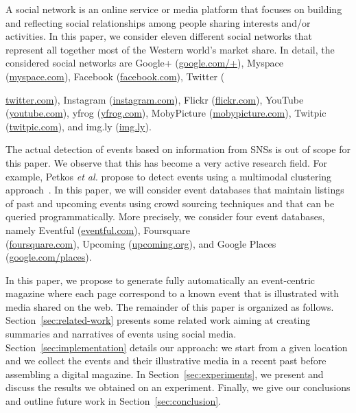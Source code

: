 \documentclass{acm_proc_article-sp}
\let\oldemph\emph
\renewcommand{\emph}[1]{\oldemph{\fontsize{9}{9}\selectfont #1}}
\begin{document}
A social network is an online service or media platform that focuses on building and reflecting social relationships among people sharing interests and/or activities. In this paper, we consider eleven different social networks that represent all together most of the Western world's market share. In detail, the considered social networks are
\mbox{Google+} (\url{google.com/+}),
Myspace (\url{myspace.com}),
Facebook (\url{facebook.com}),
Twitter ({\url{twitter.com}),
Instagram (\url{instagram.com}),
Flickr (\url{flickr.com}),
YouTube (\url{youtube.com}),
yfrog (\url{yfrog.com}),
MobyPicture (\url{mobypicture.com}),
Twitpic (\url{twitpic.com}), and
\mbox{img.ly} (\url{img.ly}).

The actual detection of events based on information from SNSs is out of scope for this paper. We observe that this has become a very active research field. For example, Petkos \emph{et al.} propose to detect events using a multimodal clustering approach~\cite{Petkos2012}. In this paper, we will consider event databases that maintain listings of past and upcoming events using crowd sourcing techniques and that can be queried programmatically. More precisely, we consider four event databases, namely Eventful (\url{eventful.com}), Foursquare \\(\url{foursquare.com}), Upcoming (\url{upcoming.org}), and Google Places (\url{google.com/places}).

In this paper, we propose to generate fully automatically an event-centric magazine where each page correspond to a known event that is illustrated with media shared on the web. The remainder of this paper is organized as follows. Section~\ref{sec:related-work} presents some related work aiming at creating summaries and narratives of events using social media. Section~\ref{sec:implementation} details our approach: we start from a given location and we collect the events and their illustrative media in a recent past before assembling a digital magazine. In Section~\ref{sec:experiments}, we present and discuss the results we obtained on an experiment. Finally, we give our conclusions and outline future work in Section~\ref{sec:conclusion}.


}
\end{document}
